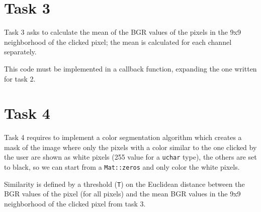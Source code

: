\documentclass{article}
\begin{document}
\section*{Task 3}
Task 3 asks to calculate the mean of the BGR values of the pixels in the 9x9 neighborhood of the clicked pixel; the mean is calculated for each channel separately.

This code must be implemented in a callback function, expanding the one written for task 2.


\section*{Task 4}
Task 4 requires to implement a color segmentation algorithm which creates a mask of the image where only the pixels with a color similar to the one clicked by the user are shown as white pixels (255 value for a \texttt{uchar} type), the others are set to black, so we can start from a \texttt{Mat::zeros} and only color the white pixels.

Similarity is defined by a threshold (\texttt{T}) on the Euclidean distance between the BGR values of the pixel (for all pixels) and the mean BGR values in the 9x9 neighborhood of the clicked pixel from task 3.
\end{document}

